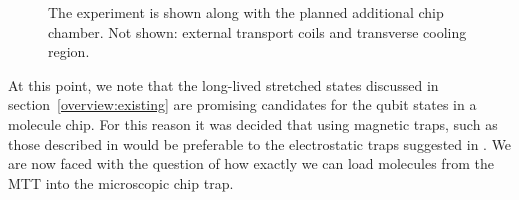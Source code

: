 \begin{figure}[htb]
  \centering
  \caption{
    The \CaF{} experiment is shown along with the planned additional chip
    chamber. Not shown: external transport coils and transverse cooling region.}
  \label{overview:fig:vacuumsystem}
\end{figure}

At this point, we note that the long-lived stretched states discussed in
section~\ref{overview:existing} are promising candidates for the qubit states
in a molecule chip. For this reason it was decided that using magnetic traps,
such as those described in  would be preferable to the
electrostatic traps suggested in . We are now faced with
the question of how exactly we can load molecules from the MTT into the
microscopic chip trap.

